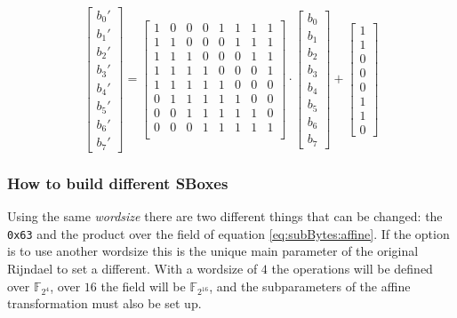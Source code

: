 \documentclass[a4paper,twoside]{llncs}
\newcommand{\Fpn}[2]{\ensuremath{\mathbb{F}_{#1^#2}}}
\begin{document}
\begin{equation}
 \left[
  \begin{array}{c}
    b_{0}'\\b_{1}'\\b_{2}'\\b_{3}'\\b_{4}'\\b_{5}'\\b_{6}'\\b_{7}'
  \end{array}
 \right]=\left[
  \begin{array}{cccccccc}
    1&0&0&0&1&1&1&1\\
    1&1&0&0&0&1&1&1\\
    1&1&1&0&0&0&1&1\\
    1&1&1&1&0&0&0&1\\
    1&1&1&1&1&0&0&0\\
    0&1&1&1&1&1&0&0\\
    0&0&1&1&1&1&1&0\\
    0&0&0&1&1&1&1&1\\
  \end{array}
 \right]\cdot\left[
  \begin{array}{c}
    b_{0}\\b_{1}\\b_{2}\\b_{3}\\b_{4}\\b_{5}\\b_{6}\\b_{7}
  \end{array}
 \right]+\left[
  \begin{array}{c}
    1\\1\\0\\0\\0\\1\\1\\0
  \end{array}
 \right]
\end{equation}


\subsubsection{How to build different SBoxes}

Using the same \emph{wordsize} there are two different things that can be changed: the \texttt{0x63} and the product over the field of equation \ref{eq:subBytes:affine}. If the option is to use another wordsize this is the unique main parameter of the original Rijndael to set a different. With a wordsize of $4$ the operations will be defined over \Fpn{2}{4}, over $16$ the field will be \Fpn{2}{{16}}, and the subparameters of the affine transformation must also be set up.
\end{document}
